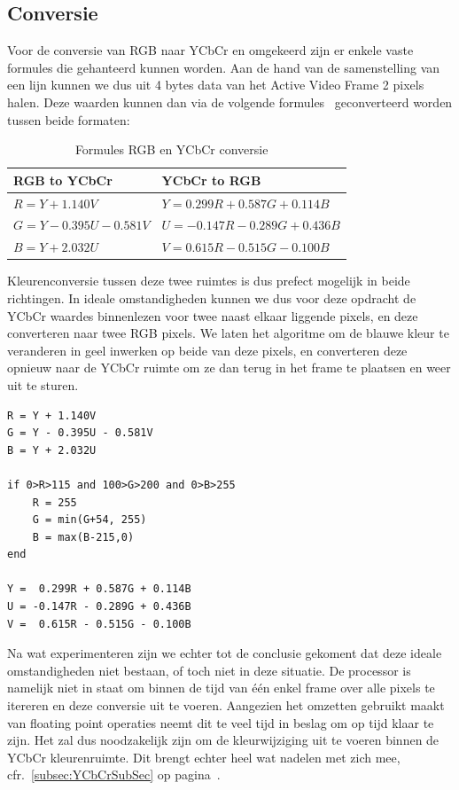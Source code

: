 	\subsection{Conversie}
	\label{subsec:KleurConversieSubSec}
		\par Voor de conversie van RGB naar YCbCr en omgekeerd zijn er enkele vaste formules die gehanteerd kunnen worden. Aan de hand van de samenstelling van een lijn kunnen we dus uit 4 bytes data van het Active Video Frame 2 pixels halen. Deze waarden kunnen dan via de volgende formules~\cite{bib_1} geconverteerd worden tussen beide formaten:
   		
   		\begin{table}[H]
			\centering
				\begin{tabular}{@{}l|l@{}}
					\toprule
					RGB to YCbCr&YCbCr to RGB  \\ \midrule
					$R = Y + 1.140V$&$Y =  0.299R + 0.587G + 0.114B$ \\
					$G = Y - 0.395U - 0.581V$&$U = -0.147R - 0.289G + 0.436B$  \\
					$B = Y + 2.032U$&$V =  0.615R - 0.515G - 0.100B$ \\ \bottomrule
				\end{tabular}
			\caption{Formules RGB en YCbCr conversie ~\cite{bib_1}}
			\label{tab:RGBYCbCrFormulesTable}
		\end{table}

		\par Kleurenconversie tussen deze twee ruimtes is dus prefect mogelijk in beide richtingen. In ideale omstandigheden kunnen we dus voor deze opdracht de YCbCr waardes binnenlezen voor twee naast elkaar liggende pixels, en deze converteren naar twee RGB pixels. We laten het algoritme om de blauwe kleur te veranderen in geel inwerken op beide van deze pixels, en converteren deze opnieuw naar de YCbCr ruimte om ze dan terug in het frame te plaatsen en weer uit te sturen.
		\bigskip
		\begin{lstlisting}[language=VBScript,caption=Pseudocode voor een kleurconversie en -vervanging van blauw naar geel]
R = Y + 1.140V
G = Y - 0.395U - 0.581V
B = Y + 2.032U

if 0>R>115 and 100>G>200 and 0>B>255
	R = 255
	G = min(G+54, 255)
	B = max(B-215,0)
end

Y =  0.299R + 0.587G + 0.114B
U = -0.147R - 0.289G + 0.436B
V =  0.615R - 0.515G - 0.100B		\end{lstlisting}

		\par Na wat experimenteren zijn we echter tot de conclusie gekoment dat deze ideale omstandigheden niet bestaan, of toch niet in deze situatie. De processor is namelijk niet in staat om binnen de tijd van \'e\'en enkel frame over alle pixels te itereren en deze conversie uit te voeren. Aangezien het omzetten gebruikt maakt van floating point operaties neemt dit te veel tijd in beslag om op tijd klaar te zijn. Het zal dus noodzakelijk zijn om de kleurwijziging uit te voeren binnen de YCbCr kleurenruimte. Dit brengt echter heel wat nadelen met zich mee, cfr.~\ref{subsec:YCbCrSubSec} op pagina~\pageref{subsec:YCbCrSubSec}.

